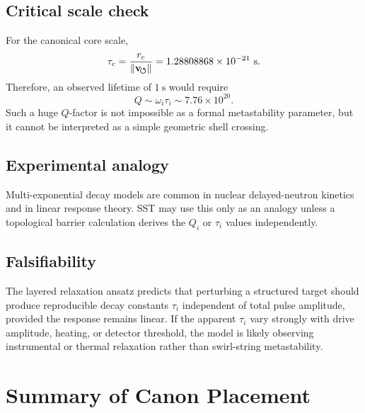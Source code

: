     \subsection*{Critical scale check}
        
        For the canonical core scale,
        \begin{equation}
            \tau_c
            =
            \frac{r_c}{\lVert\mathbf{v}_{\!\boldsymbol{\circlearrowleft}}\rVert}
            =
            1.28808868\times10^{-21}\ \mathrm{s}.
            \label{eq:core_crossing_time_numeric}
        \end{equation}
        Therefore, an observed lifetime of \(1\ \mathrm{s}\) would require
        \begin{equation}
            Q
            \sim
            \omega_i\tau_i
            \sim
            7.76\times10^{20}.
            \label{eq:large_Q_warning}
        \end{equation}
        Such a huge \(Q\)-factor is not impossible as a formal metastability parameter, but it cannot be interpreted as a simple geometric shell crossing.
    
    \subsection*{Experimental analogy}
        
        Multi-exponential decay models are common in nuclear delayed-neutron kinetics and in linear response theory. SST may use this only as an analogy unless a topological barrier calculation derives the \(Q_i\) or \(\tau_i\) values independently.
    
    \subsection*{Falsifiability}
        
        The layered relaxation ansatz predicts that perturbing a structured target should produce reproducible decay constants \(\tau_i\) independent of total pulse amplitude, provided the response remains linear. If the apparent \(\tau_i\) vary strongly with drive amplitude, heating, or detector threshold, the model is likely observing instrumental or thermal relaxation rather than swirl-string metastability.

\section{Summary of Canon Placement}
    \label{app:canon-placement-summary}
    
